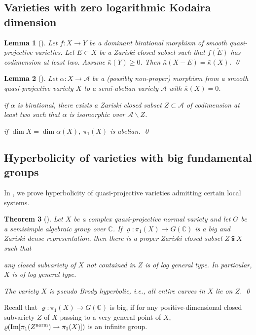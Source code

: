 \documentclass[11pt,english]{smfart}
\theoremstyle{plain}
\newtheorem{thm}{Theorem}[section]
\newtheorem{lem}[thm]{Lemma}
\theoremstyle{definition}
\theoremstyle{remark}
\numberwithin{equation}{subsection}
\theoremstyle{plain}
\newcommand{\cA}{\mathcal A}
\newcommand{\bC}{\mathbb{C}}
\begin{document}
\subsection{Varieties with zero logarithmic Kodaira dimension} \label{sec:quasi}
 \begin{lem}[]  \label{lem:same Kd}
Let $f:X\to Y$ be a dominant birational morphism of  smooth quasi-projective varieties. 
Let $E\subset X$ be a Zariski closed subset such that $\overline{f(E)}$ has codimension at least two.  
Assume $\bar{\kappa}(Y)\geq 0$.
Then $\bar{\kappa}(X-E)=\bar{\kappa}(X)$.  \qed
\end{lem} 

\begin{lem}[]
Let $\alpha:X\to \cA$ be  a  (possibly non-proper)   morphism  from a smooth quasi-projective variety $X$ to a semi-abelian variety $\cA$ with   $\overline{\kappa}(X)=0$.   
\begin{thmlist}
	\item \label{lem:abelian pi0} if $\alpha$ is birational, there exists a Zariski closed subset $Z\subset \cA$ of codimension at least two such  that $\alpha$ is   isomorphic
	over $\cA\backslash Z$.
	\item  \label{lem:abelian pi} if $\dim X=\dim \alpha(X)$,  $ \pi_1(X)$ is   abelian.    \qed
\end{thmlist}   
\end{lem}
  \subsection{Hyperbolicity of varieties with big fundamental groups}
  In \cite{CDY22}, we prove  hyperbolicity of quasi-projective varieties admitting certain local systems. 
	 \begin{thm}[]\label{main2}
	Let $X$ be a complex   quasi-projective normal variety and let $G$ be a semisimple algebraic group over $\bC$. If  $\varrho:\pi_1(X)\to G(\bC)$ is a big  and Zariski dense representation, then   there is a proper Zariski closed subset $Z\subsetneqq X$  such that
	\begin{thmlist}
		\item \label{main:log general type}    any closed  subvariety   of $X $ not contained in $Z$ is  of log general type. In particular, $X $ is of log general type.
		\item \label{main:pseudo Picard}   The variety $X $ is \emph{pseudo Brody hyperbolic}, i.e.,  all entire curves in $X $ lie on $Z$.  \qed
	\end{thmlist} 
\end{thm}
Recall that $\varrho:\pi_1(X)\to G(\bC)$  is big, if for any positive-dimensional closed subvariety $Z$ of $X$ passing to a very general point of $X$, $\varrho({\rm Im}[\pi_1(Z^{\rm norm})\to \pi_1(X)])$ is an infinite group.  
 
\end{document}

